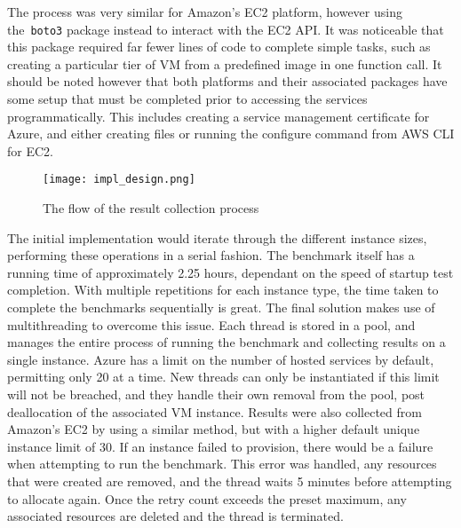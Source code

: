 \documentclass{llncs}
\begin{document}
The process was very similar for Amazon's EC2 platform, however using the~\texttt{boto3} package instead to interact with the EC2 API. It was noticeable that this package required far fewer lines of code to complete simple tasks, such as creating a particular tier of VM from a predefined image in one function call. It should be noted however that both platforms and their associated packages have some setup that must be completed prior to accessing the services programmatically. This includes creating a service management certificate for Azure, and either creating files or running the configure command from AWS CLI for EC2.

\begin{figure}[ht]
  \centering
  \texttt{[image: impl\_design.png]}
  \caption{The flow of the result collection process}
  \label{fig:impldesign}
\end{figure}

The initial implementation would iterate through the different instance sizes, performing these operations in a serial fashion. The benchmark itself has a running time of approximately 2.25 hours, dependant on the speed of startup test completion. With multiple repetitions for each instance type, the time taken to complete the benchmarks sequentially is great. The final solution makes use of multithreading to overcome this issue. Each thread is stored in a pool, and manages the entire process of running the benchmark and collecting results on a single instance. Azure has a limit on the number of hosted services by default, permitting only 20 at a time. New threads can only be instantiated if this limit will not be breached, and they handle their own removal from the pool, post deallocation of the associated VM instance. Results were also collected from Amazon's EC2 by using a similar method, but with a higher default unique instance limit of 30. If an instance failed to provision, there would be a failure when attempting to run the benchmark. This error was handled, any resources that were created are removed, and the thread waits 5 minutes before attempting to allocate again. Once the retry count exceeds the preset maximum, any associated resources are deleted and the thread is terminated.

\end{document}
